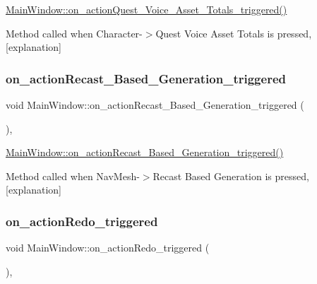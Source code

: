 \hyperlink{class_main_window_a008331d7419ef18e54e25172b94e05c0}{Main\+Window\+::on\+\_\+action\+Quest\+\_\+\+Voice\+\_\+\+Asset\+\_\+\+Totals\+\_\+triggered()} 

Method called when Character-\/$>$Quest Voice Asset Totals is pressed, \mbox{[}explanation\mbox{]} \mbox{\label{class_main_window_ab934ee7c4d674c16347171a4651765f9}} 
\subsubsection{\texorpdfstring{on\+\_\+action\+Recast\+\_\+\+Based\+\_\+\+Generation\+\_\+triggered}{on\_actionRecast\_Based\_Generation\_triggered}}
{\footnotesize\ttfamily void Main\+Window\+::on\+\_\+action\+Recast\+\_\+\+Based\+\_\+\+Generation\+\_\+triggered (\begin{DoxyParamCaption}{ }\end{DoxyParamCaption})\hspace{0.3cm}{\ttfamily [private]}, {\ttfamily [slot]}}



\hyperlink{class_main_window_ab934ee7c4d674c16347171a4651765f9}{Main\+Window\+::on\+\_\+action\+Recast\+\_\+\+Based\+\_\+\+Generation\+\_\+triggered()} 

Method called when Nav\+Mesh-\/$>$Recast Based Generation is pressed, \mbox{[}explanation\mbox{]} \mbox{\label{class_main_window_a386390413f5b36190ba30ab8d4c653d0}} 
\subsubsection{\texorpdfstring{on\+\_\+action\+Redo\+\_\+triggered}{on\_actionRedo\_triggered}}
{\footnotesize\ttfamily void Main\+Window\+::on\+\_\+action\+Redo\+\_\+triggered (\begin{DoxyParamCaption}{ }\end{DoxyParamCaption})\hspace{0.3cm}{\ttfamily [private]}, {\ttfamily [slot]}}



